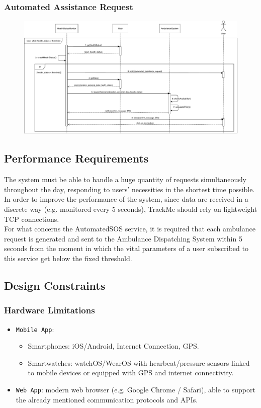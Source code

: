 \documentclass[12pt,a4paper]{article}
\begin{document}
		\subsubsection{Automated Assistance Request}
		\begin{figure}[H]
			\centering
			\includegraphics[width=1.2\linewidth]{Images/automated_request_sequence}
			\label{fig:automated_request_sequence}
		\end{figure}

	\subsection{Performance Requirements}
	The system must be able to handle a huge quantity of requests simultaneously throughout the day, responding to users' necessities in the shortest time possible. In order to improve the performance of the system, since data are received in a discrete way (e.g. monitored every 5 seconds), TrackMe should rely on lightweight TCP connections.\\
	For what concerns the AutomatedSOS service, it is required that each ambulance request is generated and sent to the Ambulance Dispatching System within 5 seconds from the moment in which the vital parameters of a user subscribed to this service get below the fixed threshold.

	\newpage
	\subsection{Design Constraints}
	\subsubsection{Hardware Limitations}
		\begin{itemize}
			\item \texttt{Mobile App}: 
				\begin{itemize}
					\item Smartphones: iOS/Android, Internet Connection, GPS.
					\item Smartwatches: watchOS/WearOS with hearbeat/pressure sensors linked to mobile devices or equipped with GPS and internet connectivity.
				\end{itemize}
			\item \texttt{Web App}: modern web browser (e.g. Google Chrome / Safari), able to support the already mentioned communication protocols and APIs.
		\end{itemize}
	
\end{document}
